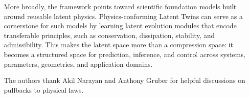 \documentclass[a4paper,fleqn]{cas-sc}
\theoremstyle{thmstyleone}%
\theoremstyle{thmstyletwo}%
\theoremstyle{thmstylethree}%
\begin{document}
More broadly, the framework points toward scientific foundation models built around reusable latent physics. Physics-conforming Latent Twins can serve as a cornerstone for such models by learning latent evolution modules that encode transferable principles, such as conservation, dissipation, stability, and admissibility. This makes the latent space more than a compression space: it becomes a structured space for prediction, inference, and control across systems, parameters, geometries, and application domains.

\medskip
{} The authors thank Akil Narayan and Anthony Gruber for helpful discussions on pullbacks to physical laws.





\printcredits

% 





\end{document}
